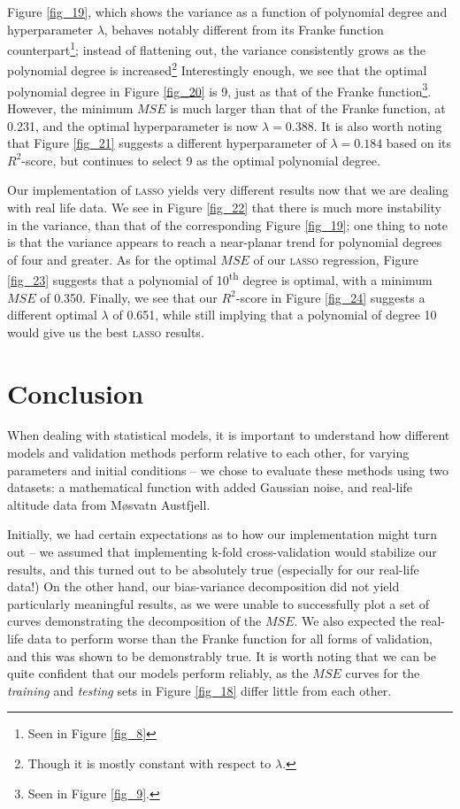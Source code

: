 \documentclass[a4paper,10pt,english]{article}
\begin{document}
\begin{multicols*}{2}
Figure \ref{fig_19}, which shows the variance as a function of polynomial degree and hyperparameter $\lambda$, behaves notably different from its Franke function counterpart\footnote{Seen in Figure \ref{fig_8}}; instead of flattening out, the variance consistently grows as the polynomial degree is increased\footnote{Though it is mostly constant with respect to $\lambda$.} Interestingly enough, we see that the optimal polynomial degree in Figure \ref{fig_20} is 9, just as that of the Franke function\footnote{Seen in Figure \ref{fig_9}.}.  However, the minimum $MSE$ is much larger than that of the Franke function, at 0.231, and the optimal hyperparameter is now $\lambda = 0.388$.  It is also worth noting that Figure \ref{fig_21} suggests a different hyperparameter of $\lambda = 0.184$ based on its $R^2$-score, but continues to select 9 as the optimal polynomial degree.

Our implementation of \textsc{lasso} yields very different results now that we are dealing with real life data.  We see in Figure \ref{fig_22} that there is much more instability in the variance, than that of the corresponding Figure \ref{fig_19}; one thing to note is that the variance appears to reach a near-planar trend for polynomial degrees of four and greater.  As for the optimal $MSE$ of our \textsc{lasso} regression, Figure \ref{fig_23} suggests that a polynomial of 10\textsuperscript{th} degree is optimal, with a minimum $MSE$ of 0.350. Finally, we see that our $R^2$-score in Figure \ref{fig_24} suggests a different optimal $\lambda$ of 0.651, while still implying that a polynomial of degree 10 would give us the best \textsc{lasso} results.

\section*{Conclusion}

When dealing with statistical models, it is important to understand how different models and validation methods perform relative to each other, for varying parameters and initial conditions – we chose to evaluate these methods using two datasets: a mathematical function with added Gaussian noise, and real-life altitude data from Møsvatn Austfjell.

Initially, we had certain expectations as to how our implementation might turn out – we assumed that implementing k-fold cross-validation would stabilize our results, and this turned out to be absolutely true (especially for our real-life data!)  On the other hand, our bias-variance decomposition did not yield particularly meaningful results, as we were unable to successfully plot a set of curves demonstrating the decomposition of the $MSE$.  We also expected the real-life data to perform worse than the Franke function for all forms of validation, and this was shown to be demonstrably true. It is worth noting that we can be quite confident that our models perform reliably, as the $MSE$ curves for the \textit{training} and \textit{testing} sets in Figure \ref{fig_18} differ little from each other.


\end{multicols*}
\end{document}
